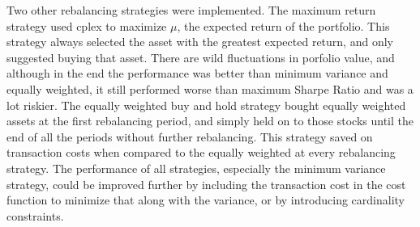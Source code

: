 \documentclass[english]{scrartcl}
\begin{document}
	Two other rebalancing strategies were implemented. The maximum return strategy used cplex to maximize $\mu$, the expected return of the portfolio. This strategy always selected the asset with the greatest expected return, and only suggested buying that asset. There are wild fluctuations in porfolio value, and although in the end the performance was better than minimum variance and equally weighted, it still performed worse than maximum Sharpe Ratio  and was a lot riskier. The equally weighted buy and hold strategy bought equally weighted assets at the first rebalancing period, and simply held on to those stocks until the end of all the periods without further rebalancing. This strategy saved on transaction costs when compared to the equally weighted at every rebalancing strategy. The performance of all strategies, especially the minimum variance strategy, could be improved further by including the transaction cost in the cost function to minimize that along with the variance, or by introducing cardinality constraints.
	
	
	
\end{document}

